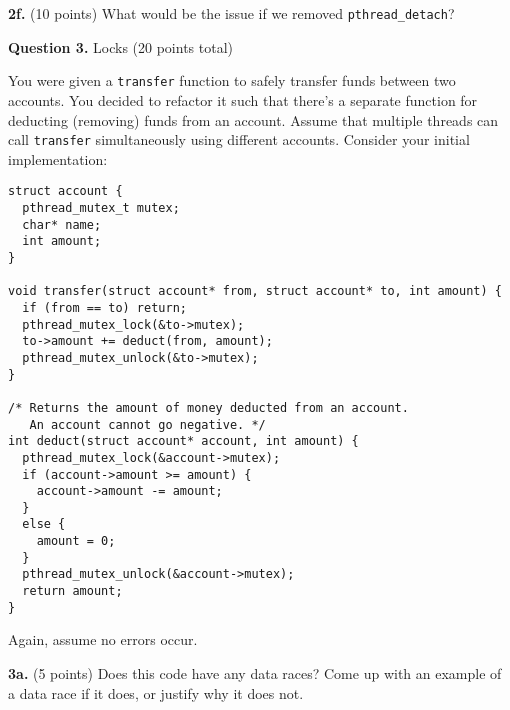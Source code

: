 \documentclass[12pt]{article}
\begin{document}
\textbf{2f.} (10 points)
What would be the issue if we removed \texttt{pthread\_detach}?


\newpage

\textbf{Question 3.} Locks (20 points total)

\vspace{1em}

You were given a \texttt{transfer} function to safely transfer funds between two
accounts.
You decided to refactor it such that there's a separate function for deducting
(removing) funds from an account.
Assume that multiple threads can call \texttt{transfer} simultaneously
using different accounts.
Consider your initial implementation:

\vspace{1em}

\begin{lstlisting}
struct account {
  pthread_mutex_t mutex;
  char* name;
  int amount;
}

void transfer(struct account* from, struct account* to, int amount) {
  if (from == to) return;
  pthread_mutex_lock(&to->mutex);
  to->amount += deduct(from, amount);
  pthread_mutex_unlock(&to->mutex);
}

/* Returns the amount of money deducted from an account.
   An account cannot go negative. */
int deduct(struct account* account, int amount) {
  pthread_mutex_lock(&account->mutex);
  if (account->amount >= amount) {
    account->amount -= amount;
  }
  else {
    amount = 0;
  }
  pthread_mutex_unlock(&account->mutex);
  return amount;
}
\end{lstlisting}

\vspace{1em}

Again, assume no errors occur.

\vspace{1em}

\textbf{3a.} (5 points)
Does this code have any data races? Come up with an example of a data race if
it does, or justify why it does not.

\end{document}
